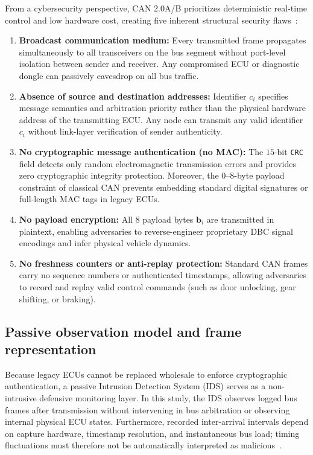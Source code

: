 \documentclass[12pt, a4paper, reqno, oneside]{book}
\DeclareRobustCommand{\code}[1]{\nolinkurl{#1}}
\begin{document}
From a cybersecurity perspective, CAN 2.0A/B prioritizes deterministic real-time control and low hardware cost, creating five inherent structural security flaws~\cite{bozdal2020evaluation,koscher2010experimental,checkoway2011comprehensive}:
\begin{enumerate}
    \item \textbf{Broadcast communication medium:} Every transmitted frame propagates simultaneously to all transceivers on the bus segment without port-level isolation between sender and receiver. Any compromised ECU or diagnostic dongle can passively eavesdrop on all bus traffic.
    \item \textbf{Absence of source and destination addresses:} Identifier $c_i$ specifies message semantics and arbitration priority rather than the physical hardware address of the transmitting ECU. Any node can transmit any valid identifier $c_i$ without link-layer verification of sender authenticity.
    \item \textbf{No cryptographic message authentication (no MAC):} The $15$-bit \code{CRC} field detects only random electromagnetic transmission errors and provides zero cryptographic integrity protection. Moreover, the $0\text{--}8$-byte payload constraint of classical CAN prevents embedding standard digital signatures or full-length MAC tags in legacy ECUs.
    \item \textbf{No payload encryption:} All $8$ payload bytes $\mathbf{b}_i$ are transmitted in plaintext, enabling adversaries to reverse-engineer proprietary DBC signal encodings and infer physical vehicle dynamics.
    \item \textbf{No freshness counters or anti-replay protection:} Standard CAN frames carry no sequence numbers or authenticated timestamps, allowing adversaries to record and replay valid control commands (such as door unlocking, gear shifting, or braking).
\end{enumerate}

\subsection{Passive observation model and frame representation}
Because legacy ECUs cannot be replaced wholesale to enforce cryptographic authentication, a passive Intrusion Detection System (IDS) serves as a non-intrusive defensive monitoring layer. In this study, the IDS observes logged bus frames after transmission without intervening in bus arbitration or observing internal physical ECU states. Furthermore, recorded inter-arrival intervals depend on capture hardware, timestamp resolution, and instantaneous bus load; timing fluctuations must therefore not be automatically interpreted as malicious~\cite{bozdal2020evaluation,verma2024road}.
\end{document}
